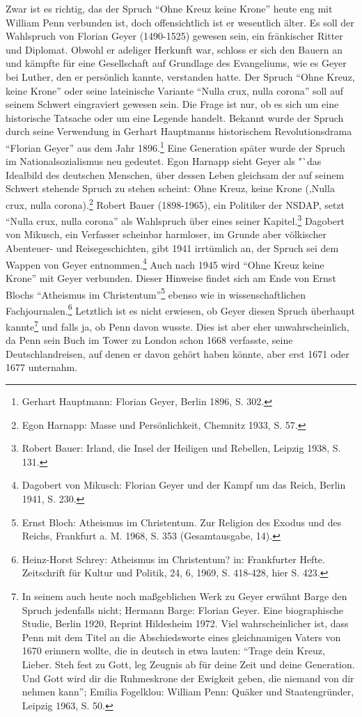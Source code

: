 Zwar ist es richtig, das der Spruch "`Ohne Kreuz keine Krone"' heute eng mit
William Penn verbunden ist, doch offensichtlich ist er wesentlich älter. Es soll
der Wahlspruch von Florian Geyer (1490-1525) gewesen sein, ein fränkischer
Ritter und Diplomat. Obwohl er adeliger Herkunft war, schloss er sich den Bauern
an und kämpfte für eine Gesellschaft auf Grundlage des Evangeliums, wie es Geyer
bei Luther, den er persönlich kannte, verstanden hatte. Der Spruch "`Ohne Kreuz,
keine Krone"' oder seine lateinische Variante "`Nulla crux, nulla corona"' soll
auf seinem Schwert eingraviert gewesen sein. Die Frage ist nur, ob es sich um
eine historische Tatsache oder um eine Legende handelt. Bekannt wurde der Spruch
durch seine Verwendung in Gerhart Hauptmanns historischem Revolutionsdrama
"`Florian Geyer"' aus dem Jahr 1896.\footnote{Gerhart Hauptmann: Florian Geyer,
Berlin 1896, S. 302.} Eine Generation später wurde der Spruch im
Nationalsozialismus neu gedeutet. Egon Harnapp sieht Geyer als "`das Idealbild
des deutschen Menschen, über dessen Leben gleichsam der auf seinem Schwert
stehende Spruch zu stehen scheint: Ohne Kreuz, keine Krone (‚Nulla crux, nulla
corona).\footnote{Egon Harnapp: Masse und Persönlichkeit, Chemnitz 1933, S. 57.}
Robert Bauer (1898-1965), ein Politiker der NSDAP, setzt "`Nulla crux, nulla
corona"' als Wahlspruch über eines seiner Kapitel.\footnote{Robert Bauer:
Irland, die Insel der Heiligen und Rebellen, Leipzig 1938, S.
131.}
Dagobert von Mikusch, ein Verfasser scheinbar harmloser, im Grunde aber
völkischer Abenteuer- und Reisegeschichten, gibt 1941 irrtümlich an, der Spruch
sei dem Wappen von Geyer entnommen.\footnote{Dagobert von Mikusch: Florian Geyer
und der Kampf um das Reich, Berlin
1941, S. 230.} Auch nach 1945 wird "`Ohne Kreuz keine
Krone"' mit Geyer verbunden. Dieser Hinweise findet sich am Ende von Ernst
Blochs "`Atheismus im Christentum"'\footnote{Ernst Bloch: Atheismus im
Christentum. Zur Religion des Exodus und des
Reichs, Frankfurt a. M. 1968, S. 353 (Gesamtausgabe, 14).} ebenso wie in
wissenschaftlichen Fachjournalen.\footnote{Heinz-Horst Schrey: Atheismus im
Christentum? in: Frankfurter Hefte.
Zeitschrift für Kultur und Politik, 24, 6, 1969, S. 418-428, hier S. 423.}
Letztlich ist es nicht erwiesen, ob Geyer diesen Spruch überhaupt
kannte\footnote{In seinem auch heute noch maßgeblichen Werk zu Geyer erwähnt
Barge den
Spruch jedenfalls nicht; Hermann Barge: Florian Geyer. Eine biographische
Studie, Berlin 1920, Reprint Hildesheim 1972. Viel wahrscheinlicher ist, dass
Penn mit dem Titel an die Abschiedsworte eines gleichnamigen Vaters von 1670
erinnern wollte, die in deutsch in etwa lauten: "`Trage dein Kreuz, Lieber. Steh
fest zu Gott, leg Zeugnis ab für deine Zeit und deine Generation. Und Gott wird
dir die Ruhmeskrone der Ewigkeit geben, die niemand von dir nehmen kann"';
Emilia Fogelklou: William Penn: Quäker und Staatengründer, Leipzig 1963, S. 50.}
und falls ja, ob Penn davon wusste. Dies ist aber eher unwahrscheinlich, da Penn
sein Buch im Tower zu London schon 1668 verfasste, seine Deutschlandreisen, auf
denen er davon gehört haben könnte, aber erst 1671 oder 1677 unternahm.

